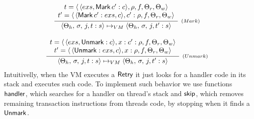 \documentclass[sigplan, anonymous, review]{acmart}
\theoremstyle{definition}
\newcommand{\C}[1]{\red{\mathsf{#1}}}
\newcommand{\F}[1]{\green{\mathsf{#1}}}
\begin{document}
\[
   \begin{array}{c}
      \infer[_{(Mark)}]
            {\langle \Theta_h,\,\sigma,\,j,t : s\rangle \mapsto_{VM}
             \langle \Theta_h,\,\sigma,\,j,t' : s\rangle}
            {\begin{array}{c}
               t = \langle\,\langle exs, \ensuremath{\C{Mark}}\,c' : c\rangle,\rho, f, \Theta_r,\Theta_w\rangle \\
               t' = \langle\,\langle \ensuremath{\C{Mark}}\,c' : exs,  c\rangle,c' : \rho, f, \Theta_r,\Theta_w\rangle
             \end{array}} \\ \\
      \infer[_{(Unmark)}]
            {\langle \Theta_h,\,\sigma,\,j,t : s\rangle \mapsto_{VM}
             \langle \Theta_h,\,\sigma,\,j,t' : s\rangle}
            {\begin{array}{c}
               t = \langle\,\langle exs, \ensuremath{\C{Unmark}} : c\rangle,x : c' : \rho, f, \Theta_r,\Theta_w\rangle \\
               t' = \langle\,\langle \ensuremath{\C{Unmark}} : exs,  c\rangle, x: \rho, f, \Theta_r,\Theta_w\rangle
             \end{array}}
   \end{array}
\]
Intuitivelly, when the VM executes a \ensuremath{\C{Retry}} it just looks for a handler code in its stack and executes such code.
To implement such behavior we use functions \ensuremath{\F{handler}}, which searches for a handler on thread's stack and \ensuremath{\F{skip}}, which
removes remaining transaction instructions from threads code, by stopping when it finds a \ensuremath{\C{Unmark}}.
\end{document}
